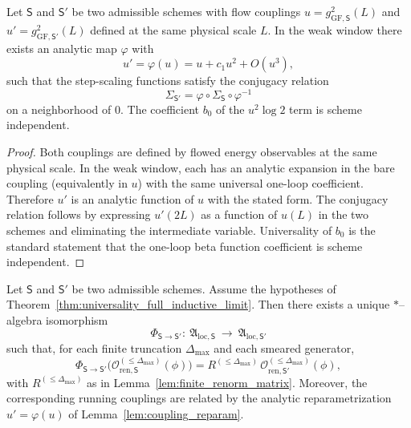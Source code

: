\begin{lemma}
\label{lem:coupling_reparam}
Let $\mathsf S$ and $\mathsf S'$ be two admissible schemes with flow couplings $u=g^2_{\mathrm{GF},\mathsf S}(L)$ and
$u'=g^2_{\mathrm{GF},\mathsf S'}(L)$ defined at the same physical scale $L$.
In the weak window there exists an analytic map $\varphi$ with
\begin{equation}\label{eq:coupling_reparam}
 u' = \varphi(u)=u+c_1 u^2+O(u^3),
\end{equation}
such that the step-scaling functions satisfy the conjugacy relation
\[\Sigma_{\mathsf S'}=\varphi\circ \Sigma_{\mathsf S}\circ \varphi^{-1}\]
on a neighborhood of $0$.
The coefficient $b_0$ of the $u^2\log 2$ term is scheme independent.
\end{lemma}

\begin{proof}
Both couplings are defined by flowed energy observables at the same physical scale.
In the weak window, each has an analytic expansion in the bare coupling (equivalently in $u$) with the same universal one-loop coefficient.
Therefore $u'$ is an analytic function of $u$ with the stated form.
The conjugacy relation follows by expressing $u'(2L)$ as a function of $u(L)$ in the two schemes and eliminating the intermediate variable.
Universality of $b_0$ is the standard statement that the one-loop beta function coefficient is scheme independent.
\end{proof}

\begin{theorem}
\label{thm:scheme_change_isomorphism}
Let $\mathsf S$ and $\mathsf S'$ be two admissible schemes.
Assume the hypotheses of Theorem~\ref{thm:universality_full_inductive_limit}.
Then there exists a unique $*$--algebra isomorphism
\[\Phi_{\mathsf S\to\mathsf S'}:\ \mathfrak A_{\mathrm{loc},\mathsf S}\ \to\ \mathfrak A_{\mathrm{loc},\mathsf S'}\]
such that, for each finite truncation $\Delta_{\max}$ and each smeared generator,
\[
\Phi_{\mathsf S\to\mathsf S'}\bigl(\mathbf{\mathcal O}^{(\le\Delta_{\max})}_{\mathrm{ren},\mathsf S}(\phi)\bigr)
 = R^{(\le\Delta_{\max})}\,\mathbf{\mathcal O}^{(\le\Delta_{\max})}_{\mathrm{ren},\mathsf S'}(\phi),
\]
with $R^{(\le\Delta_{\max})}$ as in Lemma~\ref{lem:finite_renorm_matrix}.
Moreover, the corresponding running couplings are related by the analytic reparametrization $u'=\varphi(u)$ of
Lemma~\ref{lem:coupling_reparam}.
\end{theorem}

